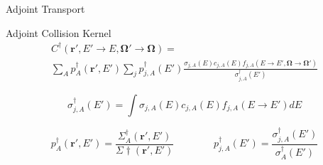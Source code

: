 \documentclass{beamer}
\begin{document}
\begin{frame}{Adjoint Transport}


\begin{block}{Adjoint Collision Kernel}
\begin{multline}
C^{\dagger}(\boldsymbol{r'},E'\rightarrow E,\boldsymbol{\Omega'}\rightarrow\boldsymbol{\Omega}) = \\
\sum_A p_A^{\dagger}(\boldsymbol{r'},E') \sum_j p^{\dagger}_{j,A}(E') \frac{\sigma_{j,A}(E)c_{j,A}(E)f_{j,A}(E\rightarrow E',\boldsymbol{\Omega}\rightarrow\boldsymbol{\Omega'})}{\sigma^{\dagger}_{j,A}(E')}
\end{multline}

\begin{equation}
\sigma^{\dagger}_{j,A}(E') = \int\sigma_{j,A}(E)c_{j,A}(E)f_{j,A}(E\rightarrow E')dE
\end{equation}

\begin{equation}
p^{\dagger}_A(\boldsymbol{r'},E') = \frac{\Sigma^{\dagger}_A(\boldsymbol{r'},E')}{\Sigma{\dagger}(\boldsymbol{r'},E')}
~~~~~~~~~~~~~~~~~~
p^{\dagger}_{j,A}(E') = \frac{\sigma^{\dagger}_{j,A}(E')}{\sigma^{\dagger}_A(E')} \nonumber
\end{equation}

\end{block}

\end{frame}
\end{document}
